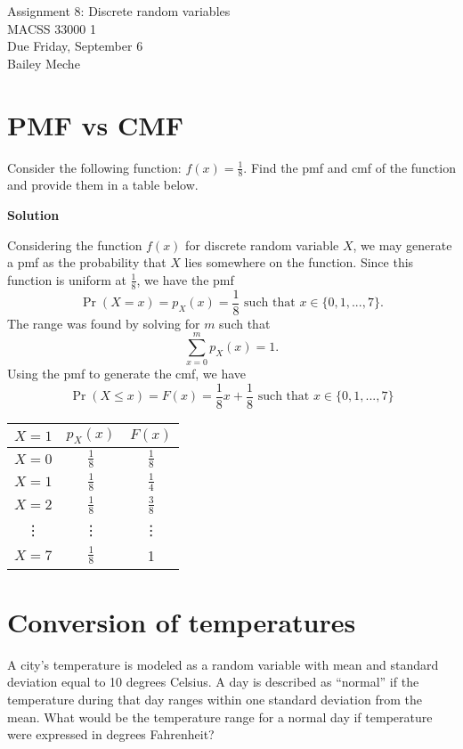 \documentclass[12pt]{article}
\begin{document}
	\begin{center}
		Assignment 8: Discrete random variables\\
        MACSS 33000 1 \\
		Due Friday, September 6 \\
       Bailey Meche
	\end{center}

\section{PMF vs CMF}

Consider the following function: $f(x) = \frac{1}{8}$. Find the pmf and cmf of the function and provide them in a table below.

\textbf{Solution}

Considering the function $f(x)$ for discrete random variable $X$, we may generate a pmf as the probability that $X$ lies somewhere on the function. Since this function is uniform at $\frac{1}{8}$, we have the pmf \[\Pr(X=x)= p_X(x) = \frac{1}{8} \text{ such that } x \in \{0,1,...,7\}. \]
The range was found by solving for $m$ such that \[ \sum_{x=0}^m p_X(x)=1.\]
Using the pmf to generate the cmf, we have 
\[ \Pr(X \leq x) = F(x) = \frac{1}{8}x+\frac{1}{8} 
\text{ such that } x \in \{0,1,...,7\}\]


\begin{center}
\begin{tabular}{ c |c |c  }
 $X=1$ & $p_X(x)$ & $F(x)$ 
 \\  \hline 
 $X=0$ &  $\frac{1}{8}$ & $\frac{1}{8}$\\  
 $X=1 $& $\frac{1}{8}$& $\frac{1}{4}$ \\  
 $X=2$&  $\frac{1}{8}$ & $\frac{3}{8}$
 \\ \vdots & \vdots &\vdots
 \\ $X=7$ & $\frac{1}{8}$ & 1
 \end{tabular}
\end{center}

\section{Conversion of temperatures}
A city’s temperature is modeled as a random variable with mean and standard deviation equal to 10 degrees Celsius. A day is described as “normal” if the temperature during that day ranges within one standard deviation from the mean. What would be the temperature range for a normal day if temperature were expressed in degrees Fahrenheit?
\end{document}
